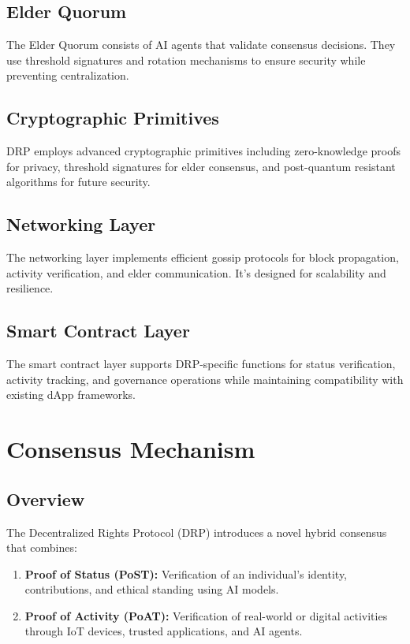 \documentclass[11pt,a4paper]{article}
\begin{document}
\subsection{Elder Quorum}
The Elder Quorum consists of AI agents that validate consensus decisions. They use threshold signatures and rotation mechanisms to ensure security while preventing centralization.

\subsection{Cryptographic Primitives}
DRP employs advanced cryptographic primitives including zero-knowledge proofs for privacy, threshold signatures for elder consensus, and post-quantum resistant algorithms for future security.

\subsection{Networking Layer}
The networking layer implements efficient gossip protocols for block propagation, activity verification, and elder communication. It's designed for scalability and resilience.

\subsection{Smart Contract Layer}
The smart contract layer supports DRP-specific functions for status verification, activity tracking, and governance operations while maintaining compatibility with existing dApp frameworks.


\section{Consensus Mechanism}

\subsection{Overview}
The Decentralized Rights Protocol (DRP) introduces a novel hybrid consensus that combines:
\begin{enumerate}
    \item \textbf{Proof of Status (PoST):} Verification of an individual's identity, contributions, and ethical standing using AI models.
    \item \textbf{Proof of Activity (PoAT):} Verification of real-world or digital activities through IoT devices, trusted applications, and AI agents.
\end{enumerate}
\end{document}
